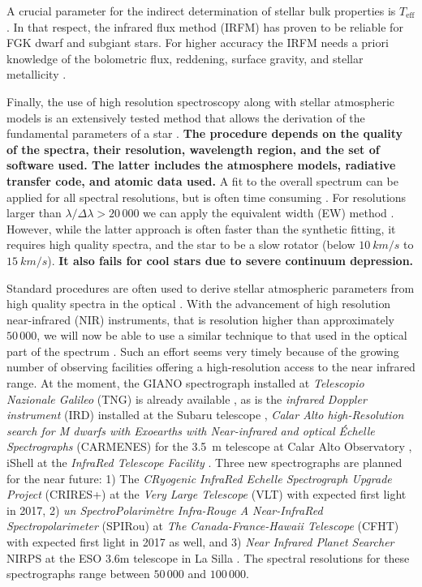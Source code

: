 \documentclass{aa}
\begin{document}
A crucial parameter for the indirect determination of stellar bulk properties is
$T_\mathrm{eff}$. In that respect, the infrared flux method (IRFM) has
proven to be reliable for FGK dwarf and subgiant stars. For higher accuracy the
IRFM needs a priori knowledge of the bolometric flux, reddening, surface
gravity, and stellar metallicity
\citep{Blackwell1977,Ramirez2005b,Casagrande2010}.

Finally, the use of high resolution spectroscopy along with stellar atmospheric
models is an extensively tested method that allows the derivation of the
fundamental parameters of a star
\citep[see e.g.][]{Valenti2005,Santos13,Worley2016}. {\bf The procedure depends
on the quality of the spectra, their resolution, wavelength region, and the set
of software used. The latter includes the atmosphere models, radiative transfer
code, and atomic data used.} A fit to the overall spectrum can be applied for
all spectral resolutions, but is often time consuming
\citep[see e.g.][]{Recio2006,Tsantaki2014}. For resolutions larger than
$\lambda/\Delta\lambda > 20\,000$ we can apply the equivalent width (EW) method
\citep[see e.g.][for details]{Tsantaki2013,Andreasen2017a}. However, while the
latter approach is often faster than the synthetic fitting, it requires high
quality spectra, and the star to be a slow rotator (below $\SI{10}{km/s}$ to
$\SI{15}{km/s}$). {\bf It also fails for cool stars due to severe continuum
depression.}

Standard procedures are often used to derive stellar atmospheric parameters from
high quality spectra in the optical \citep[see e.g.][]{Valenti2005,Sousa2008a}.
With the advancement of high resolution near-infrared (NIR) instruments, that is
resolution higher than approximately $50\,000$, we will now be able to use a
similar technique to that used in the optical part of the spectrum
\citep[see e.g.][]{Melendez1999,Sousa2008a,Tsantaki2013,Mucciarelli2013,Bensby2014}.
Such an effort seems very timely because of the growing number of observing
facilities offering a high-resolution access to the near infrared range. At the
moment, the GIANO spectrograph installed at \emph{Telescopio Nazionale Galileo}
(TNG) is already available \citep{GIANO}, as is the \emph{infrared Doppler
instrument} (IRD) installed at the Subaru telescope \citep{IRD}, \emph{Calar
Alto high-Resolution search for M dwarfs with Exoearths with Near-infrared and
optical Échelle Spectrographs} (CARMENES) for the \SI{3.5}{m} telescope at Calar
Alto Observatory \citep{CARMENES}, iShell at the \emph{InfraRed Telescope
Facility} \citep{ishell1,ishell2}. Three new spectrographs are planned for the
near future: 1) The \emph{CRyogenic InfraRed Echelle Spectrograph Upgrade
Project} (CRIRES+) at the \emph{Very Large Telescope} (VLT) \citep{CRIRESp} with
expected first light in 2017, 2) \emph{un SpectroPolarimètre Infra-Rouge A
Near-InfraRed Spectropolarimeter} (SPIRou) at \emph{The Canada-France-Hawaii
Telescope} (CFHT) \citep{SPIROU1,SPIROU2} with expected first light in 2017 as
well, and 3) \emph{Near Infrared Planet Searcher} NIRPS at the ESO 3.6m
telescope in La Silla \citep{NIRPS}. The spectral resolutions for these
spectrographs range between $50\,000$ and $100\,000$.
\end{document}
